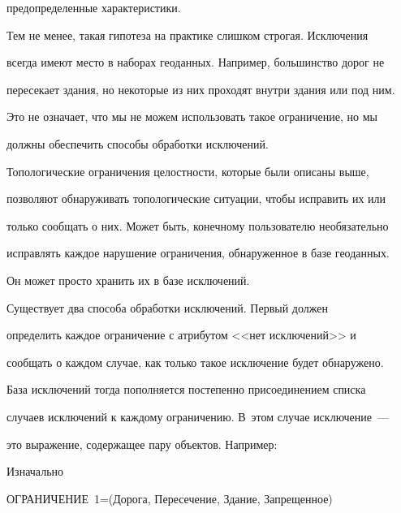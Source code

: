 предопределенные характеристики. 


    


    Тем не менее, такая гипотеза на практике слишком строгая. Исключения 


всегда имеют место в наборах геоданных. Например, большинство дорог не 


пересекает здания, но некоторые из них проходят внутри здания или под ним. 


Это не означает, что мы не можем использовать такое ограничение, но мы 


должны обеспечить способы обработки исключений. 


    


    Топологические ограничения целостности, которые были описаны выше, 


позволяют обнаруживать топологические ситуации, чтобы исправить их или 


только сообщать о них. Может быть, конечному пользователю необязательно 


исправлять каждое нарушение ограничения, обнаруженное в базе геоданных. 


Он может просто хранить их в базе исключений. 


    


    Существует два способа обработки исключений. Первый должен 


определить каждое ограничение с атрибутом <<{нет исключений}>>  и 


сообщать о каждом случае, как только такое исключение будет обнаружено. 


База исключений тогда пополняется постепенно присоединением списка 


случаев исключений к каждому ограничению. В~этом случае исключение~--- 


это выражение, содержащее пару объектов. Например:


    \smallskip


    


\noindent


Изначально 





\noindent


ОГРАНИЧЕНИЕ~1\;=\;(Дорога, Пересечение, Здание, Запрещенное) 








